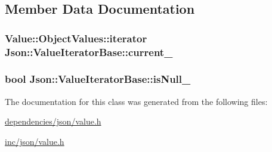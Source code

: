 \subsection{Member Data Documentation}
\hypertarget{classJson_1_1ValueIteratorBase_ab3138ce8af8301cca3b041ea55cb922a}{
\subsubsection[{current\-\_\-}]{\setlength{\rightskip}{0pt plus 5cm}Value\-::\-Object\-Values\-::iterator Json\-::\-Value\-Iterator\-Base\-::current\-\_\-\hspace{0.3cm}{\ttfamily [private]}}}\label{dc/d8a/classJson_1_1ValueIteratorBase_ab3138ce8af8301cca3b041ea55cb922a}
\hypertarget{classJson_1_1ValueIteratorBase_a3e08b114a1aed9bde518c527f94a8c59}{
\subsubsection[{is\-Null\-\_\-}]{\setlength{\rightskip}{0pt plus 5cm}bool Json\-::\-Value\-Iterator\-Base\-::is\-Null\-\_\-\hspace{0.3cm}{\ttfamily [private]}}}\label{dc/d8a/classJson_1_1ValueIteratorBase_a3e08b114a1aed9bde518c527f94a8c59}


The documentation for this class was generated from the following files\-:\begin{DoxyCompactItemize}
\item 
\hyperlink{dependencies_2json_2value_8h}{dependencies/json/value.\-h}\item 
\hyperlink{inc_2json_2value_8h}{inc/json/value.\-h}\end{DoxyCompactItemize}
